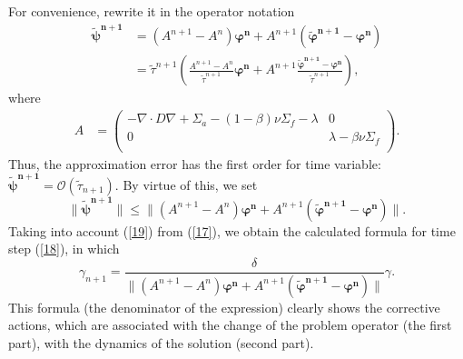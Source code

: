 \documentclass[runningheads]{llncs}
\begin{document}
For convenience, rewrite it in the operator notation
\[
\begin{split}
\bm{\widetilde{\psi}^{n+1}} &= (A^{n+1} - A^n)\bm{\varphi^n} + {A}^{n+1}(\bm{\widetilde{\varphi}^{n+1}} - \bm{\varphi^n}) \\
&= \widetilde{\tau}^{n+1} \left( \frac{A^{n+1} - A^n}{\widetilde{\tau}^{n+1}} \bm{\varphi^n} + A^{n+1} \frac{\bm{\widetilde{\varphi}^{n+1}} - \bm{\varphi^n}}{\widetilde{\tau}^{n+1}} \right),
\end{split}
\]
where 
\[
\begin{split}
A &= \begin{pmatrix}
  - \nabla \cdot D \nabla  + \Sigma_{a}  - (1-\beta) \nu \Sigma_{f} - \lambda & 0  \\
  0  & \lambda - \beta\nu\Sigma_f   \\
 \end{pmatrix}.
\end{split} 
\]
Thus, the approximation error has the first order for
time variable:
$
\bm{\widetilde{\psi}^{n+1}} = \mathcal{O} (\widetilde{\tau}_{n+1}).
$
By virtue of this, we set 
\begin{equation}\label{19}
 \|\bm{\widetilde{\psi}^{n+1}} \| \leq \| (A^{n+1} - A^n) \bm{\varphi^n} +
 A^{n+1} (\bm{\widetilde{\varphi}^{n+1}} - \bm{\varphi^n}) \| .
\end{equation} 
Taking into account (\ref{19})  from (\ref{17}), we obtain the calculated formula for time step (\ref{18}), in which
\begin{equation}\label{20}
  \gamma_{n+1} = \frac{\delta}{ \| (A^{n+1} - A^n) \bm{\varphi^n}  +
  A^{n+1} (\bm{\widetilde{\varphi}^{n+1}} - \bm{\varphi^n}) \| } \gamma .
\end{equation}
This formula (the denominator of the expression) clearly shows the corrective actions, which are associated with the change of the problem operator (the first part), with the dynamics of the solution (second part).
\end{document}
